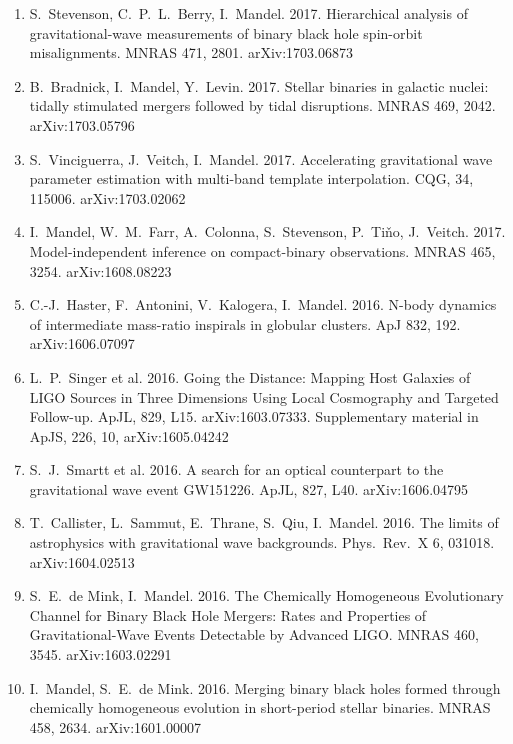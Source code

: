 \documentclass[margin,line]{res}
\begin{document}
\begin{resume}
\begin{enumerate}
\item S.~Stevenson, C.~P.~L.~Berry, I.~Mandel.  2017.  Hierarchical analysis of gravitational-wave measurements of binary black hole spin-orbit misalignments.  MNRAS 471, 2801. arXiv:1703.06873

\item B.~Bradnick, I.~Mandel, Y.~Levin. 2017.  Stellar binaries in galactic nuclei: tidally stimulated mergers followed by tidal disruptions.  MNRAS 469, 2042.  arXiv:1703.05796

\item S.~Vinciguerra, J.~Veitch, I.~Mandel.  2017.  Accelerating gravitational wave parameter estimation with multi-band template interpolation.  CQG, 34, 115006.  arXiv:1703.02062

\item I.~Mandel, W.~M.~Farr, A.~Colonna, S.~Stevenson, P.~Ti\v{n}o, J.~Veitch.  2017.  Model-independent inference on compact-binary observations.  MNRAS 465, 3254.  arXiv:1608.08223

\item C.-J.~Haster, F.~Antonini, V.~Kalogera, I.~Mandel. 2016. N-body dynamics of intermediate mass-ratio inspirals in globular clusters. ApJ 832, 192.  arXiv:1606.07097

\item L.~P.~Singer et al. 2016.  Going the Distance: Mapping Host Galaxies of LIGO Sources in Three Dimensions Using Local Cosmography and Targeted Follow-up.  ApJL, 829, L15. arXiv:1603.07333.   Supplementary material in ApJS, 226, 10, arXiv:1605.04242

\item S.~J.~Smartt et al.  2016.  A search for an optical counterpart to the gravitational wave event GW151226.  ApJL, 827, L40. arXiv:1606.04795

\item T.~Callister, L.~Sammut, E.~Thrane, S.~Qiu, I.~Mandel.  2016. The limits of astrophysics with gravitational wave backgrounds. Phys.~Rev.~X 6, 031018.  arXiv:1604.02513

\item S.~E.~de Mink, I.~Mandel. 2016. The Chemically Homogeneous Evolutionary Channel for Binary Black Hole Mergers: Rates and Properties of Gravitational-Wave Events Detectable by Advanced LIGO.  MNRAS 460, 3545.  arXiv:1603.02291

\item I.~Mandel, S.~E.~de Mink.  2016.  Merging binary black holes formed through chemically homogeneous evolution in short-period stellar binaries. MNRAS 458, 2634. arXiv:1601.00007


\end{enumerate}
\end{resume}
\end{document}
